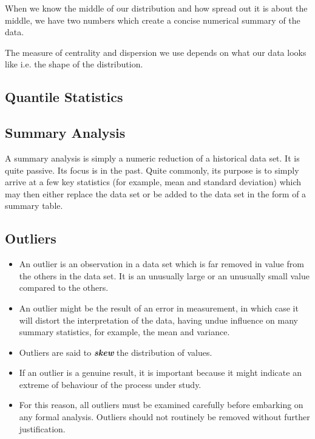 \documentclass[]{report}
\begin{document}
{When we know the middle of our distribution and how spread out it is about the middle, we have two numbers which create a concise numerical summary of the data. 

The measure of centrality and dispersion we use depends on what our data looks like i.e. the shape of the distribution.




\subsection{Quantile Statistics}



















\subsection{Summary Analysis}

A summary analysis is simply a numeric reduction of a historical data set. It is quite passive. Its focus is in the past. Quite commonly, its purpose is to simply arrive at a few key statistics (for example, mean and standard deviation) which may then either replace the data set or be added to the data set in the form of a summary table.

\subsection{Outliers}

\begin{itemize}
\item
An outlier is an observation in a data set which is far removed in value from the others in the data set. It is an unusually large or an unusually small value compared to the others.
\item
An outlier might be the result of an error in measurement, in which case it will distort the interpretation of the data, having undue influence on many summary statistics, for example, the mean and variance.
\item Outliers are said to \textbf{\emph{skew}} the distribution of values.
\item
If an outlier is a genuine result, it is important because it might indicate an extreme of behaviour of the process under study. \item For this reason, all outliers must be examined carefully before embarking on any formal analysis. Outliers should not routinely be removed without further justification.
\end{itemize}
}
\end{document}
